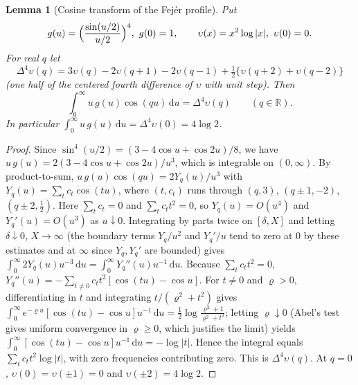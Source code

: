 \documentclass[preprint,12pt,a4paper]{elsarticle}
\newtheorem{lemma}[theorem]{Lemma}
\theoremstyle{remark}
\newcommand{\R}{\mathbb R}
\newcommand{\dd}{\,\mathrm d}
\begin{document}
\begin{lemma}[Cosine transform of the Fej\'er profile]\label{lem:fejer-cosine}
Put
\[
 g(u)=\Bigl(\frac{\sin(u/2)}{u/2}\Bigr)^4,\ g(0)=1,\qquad
 \upsilon(x)=x^2\log|x|,\ \upsilon(0)=0 .
\]
For real $q$ let
\begin{equation}\label{eq:delta4}
 \Delta^4\upsilon(q)=3\upsilon(q)-2\upsilon(q+1)-2\upsilon(q-1)
 +\tfrac12\{\upsilon(q+2)+\upsilon(q-2)\}
\end{equation}
(one half of the centered fourth difference of $\upsilon$ with unit step). Then
\[
 \int_0^\infty u\,g(u)\cos(qu)\dd u=\Delta^4\upsilon(q)\qquad(q\in\R).
\]
In particular $\int_0^\infty u\,g(u)\dd u=\Delta^4\upsilon(0)=4\log2$.
\end{lemma}
\begin{proof}
Since $\sin^4(u/2)=(3-4\cos u+\cos2u)/8$, we have
$u\,g(u)=2(3-4\cos u+\cos2u)/u^3$, which is integrable on $(0,\infty)$.
By product-to-sum, $u\,g(u)\cos(qu)=2Y_q(u)/u^3$ with
$Y_q(u)=\sum_tc_t\cos(tu)$, where $(t,c_t)$ runs through
$(q,3)$, $(q\pm1,-2)$, $(q\pm2,\frac12)$. Here $\sum_tc_t=0$ and
$\sum_tc_tt^2=0$, so $Y_q(u)=O(u^4)$ and $Y_q'(u)=O(u^3)$ as
$u\downarrow0$. Integrating by parts twice on $[\delta,X]$ and letting
$\delta\downarrow0$, $X\to\infty$ (the boundary terms $Y_q/u^2$ and
$Y_q'/u$ tend to zero at $0$ by these estimates and at $\infty$ since
$Y_q,Y_q'$ are bounded) gives
$\int_0^\infty2Y_q(u)u^{-3}\dd u=\int_0^\infty Y_q''(u)u^{-1}\dd u$.
Because $\sum_tc_tt^2=0$,
$Y_q''(u)=-\sum_{t\ne0}c_tt^2[\cos(tu)-\cos u]$. For $t\ne0$ and
$\varrho>0$, differentiating in $t$ and integrating
$t/(\varrho^2+t^2)$ gives
$\int_0^\infty e^{-\varrho u}[\cos(tu)-\cos u]u^{-1}\dd u
=\frac12\log\frac{\varrho^2+1}{\varrho^2+t^2}$; letting
$\varrho\downarrow0$ (Abel's test gives uniform convergence in $\varrho\ge0$,
which justifies the limit) yields
$\int_0^\infty[\cos(tu)-\cos u]u^{-1}\dd u=-\log|t|$. Hence the integral
equals $\sum_{t}c_tt^2\log|t|$, with zero frequencies contributing zero.
This is $\Delta^4\upsilon(q)$. At $q=0$, $\upsilon(0)=\upsilon(\pm1)=0$ and $\upsilon(\pm2)=4\log2$.
\end{proof}
\end{document}
